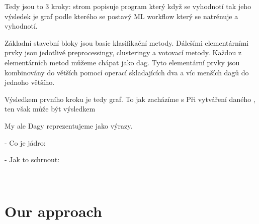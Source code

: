 \documentclass[a4paper,oneside]{memoir}
\begin{document}
Tedy jsou to 3 kroky: strom popisuje program který když se vyhodnotí tak jeho výsledek je graf podle kterého se postavý ML workflow který se natrénuje a vyhodnotí.


Základní stavební bloky jsou basic klasifikační metody.
Dálešími elementárními prvky jsou jedotlivé preprocessingy, clusteringy a votovací metody. 
Každou z elementárních metod můžeme chápat jako dag.
Tyto elementární prvky jsou kombinovány do větších pomocí operací skladajících dva a víc menších dagů do jednoho většího.

 


Výsledkem prvního kroku je tedy graf. 
To jak zacházíme s Při vytváření daného , ten však může být výsledkem  

My ale
Dagy reprezentujeme jako výrazy.

- Co je jádro:

- Jak to schrnout:

~\\



\section{Our approach}


\newcommand{\Dlong}{unlabeled data\xspace}
\newcommand{\LDlong}{labeled data\xspace}
\newcommand{\Dshort}{\textit{$D$}\xspace}
\newcommand{\LDshort}{\textit{$LD$}\xspace}
\newcommand{\dia}{\textit{$ens_1$}\xspace}
\newcommand{\diaZero}{\textit{$ens_0$}\xspace}
\newcommand{\splitComb}{\textit{$split$}\xspace}
\newcommand{\cons}{\textit{$cons$}\xspace}

\newcommand{\komb}[1]{\textit{#1}}
\newcommand{\kons}[1]{\textbf{#1}}

\newcommand{\Dag}{\kons{Dag}}
\newcommand{\D}{\kons{D}}
\newcommand{\LD}{\kons{LD}}
\newcommand{\Boo}{\kons{Boo}}
\newcommand{\V}{\kons{V}}
\newcommand{\Succ}{\kons{S}}
\newcommand{\Zero}{\kons{0}}
\newcommand{\Same}{\kons{Same}}
\newcommand{\Disjoint}{\kons{Disjoint}}

\newcommand{\Suc}[1]{(\Succ\ #1)}
\newcommand{\Ve}[3]{(\V\ #1\ #2\ #3)}

\newcommand{\DAG}[2]{(\Dag\ #1\ #2)}
\newcommand{\splitter}[4]{\DAG{#1}{\Ve{#2}{#3}{#4}}}
\newcommand{\merger}[4]{\DAG{\Ve{#1}{#3}{#4}}{#2}}
\newcommand{\dvaPlus}[1]{\Suc{\Suc{#1}}}
\newcommand{\dva}{\dvaPlus{\Zero}}


\end{document}

